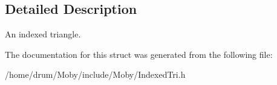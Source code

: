 \subsection{Detailed Description}
An indexed triangle. 

The documentation for this struct was generated from the following file\-:\begin{DoxyCompactItemize}
\item 
/home/drum/\-Moby/include/\-Moby/Indexed\-Tri.\-h\end{DoxyCompactItemize}
